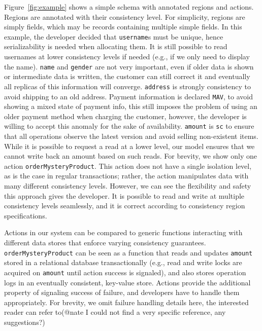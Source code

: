 \documentclass[preprint,numbers]{sigplanconf}
\begin{document}
Figure~\ref{fig:example} shows a simple schema with annotated
regions and actions. Regions are annotated 
with their consistency level. For simplicity, regions are simply fields,
which may be records containing multiple simple fields.
In this example, the developer decided that \texttt{username}s must be 
unique, hence serializability is needed
when allocating them. It is still possible to read usernames at lower
consistency levels if needed (e.g., if we only need to display the name). 
\texttt{name} and \texttt{gender} are not very important, even if older
data is shown or intermediate data is written, the customer can still correct
it and eventually all replicas of this information will converge.
\texttt{address} is strongly consistency to avoid shipping to an old address.
Payment information is declared \texttt{MAV}, to avoid showing a mixed state of payment info, this still
imposes the problem of using an older payment method when charging the customer,
however, the developer is willing to accept this anomaly for the sake of
availability. \texttt{amount} is \texttt{sc} to ensure that all operations
observe the latest version and avoid selling non-existent items. While it is possible to request a read at a lower
level, our model ensures that we cannot write back an amount based on such reads. For brevity,
we show only one action \texttt{orderMysteryProduct}. This action does
not have a single isolation level, as is the case in regular transactions;
rather, the action manipulates data with many different consistency levels.
However, we can see the flexibility and safety this approach gives the
developer. It is possible to read and write at multiple consistency levels
seamlessly, and it is correct according to consistency region specifications.

Actions in our system can be compared to generic functions interacting
with different data stores that enforce varying consistency guarantees.
\texttt{orderMysteryProduct} can be seen as a function that
reads and updates \texttt{amount} stored in a relational database
transactionally (e.g., read and write locks are acquired on \texttt{amount} until
action success is signaled), and also stores operation logs in an eventually consistent,
key-value store. Actions provide the additional property of signaling success
of failure, and developers have to handle them appropriately. For brevity, we
omit failure handling details here, the interested reader can refer to(@nate I
could not find a very specific reference, any suggestions?)
\end{document}
